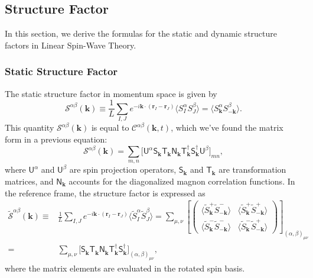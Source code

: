 \documentclass[aps, prx, nofootinbib, superscriptaddress]{revtex4-2}
\newcommand{\kvec}{\mathbf{k}}
\begin{document}
\subsection{Structure Factor}\label{subsec: Structure Factor}

In this section, we derive the formulas for the static and dynamic structure factors in Linear Spin-Wave Theory.

\subsubsection{Static Structure Factor}

The static structure factor in momentum space is given by
\begin{equation}
    \mathcal{S}^{\alpha\beta} (\mathbf{k}) 
    \equiv \frac{1}{L} 
    \sum_{I, J}
    e^{- i \mathbf{k} \cdot ( \mathbf{r}_{I} -  \mathbf{r}_{J} ) }
    \langle 
    S_{I}^{\alpha}
    S_{J}^{\beta} 
    \rangle 
    = \big\langle S^{\alpha}_{\kvec} S^{\beta}_{-\kvec} \big\rangle.
\end{equation}
This quantity $\mathcal{S}^{\alpha\beta} (\mathbf{k})$ is equal to $\mathcal{C}^{\alpha\beta}(\kvec, t)$, which we've found the matrix form in a previous equation:
\begin{equation}
    \mathcal{S}^{\alpha\beta} (\mathbf{k}) = 
    \sum_{m,n} 
    \big[ \mathsf{U}^{\alpha} 
    \mathsf{S}_{\kvec}^{\phantom \dagger} 
    \mathsf{T}_{\kvec}^{\phantom \dagger} 
    \mathsf{N}_{\kvec}^{\phantom \dagger}
    \mathsf{T}_{\kvec}^{         \dagger}
    \mathsf{S}_{\kvec}^{         \dagger}
    \mathsf{U}^{\beta} \big]_{mn},
\end{equation}
where $\mathsf{U}^{\alpha}$ and $\mathsf{U}^{\beta}$ are spin projection operators, $\mathsf{S}_{\kvec}$ and $\mathsf{T}_{\kvec}$ are transformation matrices, and $\mathsf{N}_{\kvec}$ accounts for the diagonalized magnon correlation functions.
In the reference frame, the structure factor is expressed as
\begin{align*}
    \widetilde{\mathcal{S}}^{\alpha\beta} (\mathbf{k}) 
    \equiv &
    \frac{1}{L} 
    \sum_{I, J}
    e^{- i \mathbf{k} \cdot ( \mathbf{r}_{I} -  \mathbf{r}_{J} ) }
    \langle \widetilde{S}_{I}^{\alpha} \widetilde{S}_{J}^{\beta} \rangle 
    = 
    \sum_{\mu, \nu} 
    \left[
    \begin{pmatrix}
        \langle \widetilde{S}^{+}_{\kvec} \widetilde{S}^{-}_{-\kvec} \rangle &
        \langle \widetilde{S}^{+}_{\kvec} \widetilde{S}^{+}_{-\kvec} \rangle \\[0.25em]
        \langle \widetilde{S}^{-}_{\kvec} \widetilde{S}^{-}_{-\kvec} \rangle &
        \langle \widetilde{S}^{-}_{\kvec} \widetilde{S}^{+}_{-\kvec} \rangle
    \end{pmatrix} 
    \right]_{(\alpha, \beta)_{\mu\nu}}
    \\ = &
    \sum_{\mu, \nu} 
    \big[
    \mathsf{S}_{\kvec}^{\phantom \dagger} 
    \mathsf{T}_{\kvec}^{\phantom \dagger} 
    \mathsf{N}_{\kvec}^{\phantom \dagger}  
    \mathsf{T}_{\kvec}^{         \dagger}
    \mathsf{S}_{\kvec}^{         \dagger}
    \big]_{(\alpha, \beta)_{\mu\nu}},
\end{align*}
where the matrix elements are evaluated in the rotated spin basis.
\end{document}
